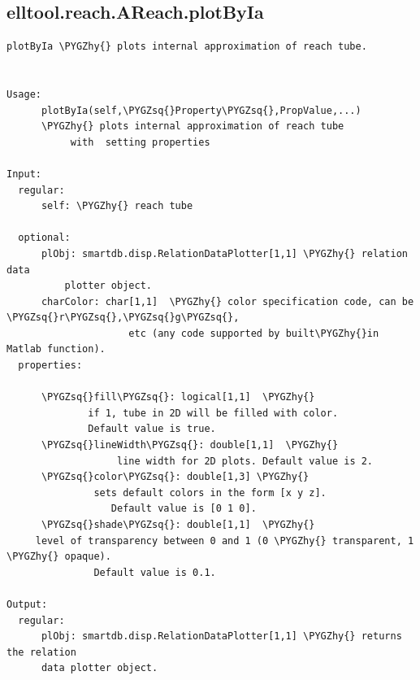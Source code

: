 \documentclass[letterpaper,10pt,english]{sphinxmanual}
\def\PYGZhy{\char`\-}
\def\PYGZsq{\char`\'}
\begin{document}
\subsection{elltool.reach.AReach.plotByIa}
\label{chap_functions:elltool-reach-areach-plotbyia}
\begin{Verbatim}[commandchars=\\\{\}]
plotByIa \PYGZhy{} plots internal approximation of reach tube.


Usage:
      plotByIa(self,\PYGZsq{}Property\PYGZsq{},PropValue,...)
      \PYGZhy{} plots internal approximation of reach tube
           with  setting properties

Input:
  regular:
      self: \PYGZhy{} reach tube

  optional:
      plObj: smartdb.disp.RelationDataPlotter[1,1] \PYGZhy{} relation data
          plotter object.
      charColor: char[1,1]  \PYGZhy{} color specification code, can be \PYGZsq{}r\PYGZsq{},\PYGZsq{}g\PYGZsq{},
                     etc (any code supported by built\PYGZhy{}in Matlab function).
  properties:

      \PYGZsq{}fill\PYGZsq{}: logical[1,1]  \PYGZhy{}
              if 1, tube in 2D will be filled with color.
              Default value is true.
      \PYGZsq{}lineWidth\PYGZsq{}: double[1,1]  \PYGZhy{}
                   line width for 2D plots. Default value is 2.
      \PYGZsq{}color\PYGZsq{}: double[1,3] \PYGZhy{}
               sets default colors in the form [x y z].
                  Default value is [0 1 0].
      \PYGZsq{}shade\PYGZsq{}: double[1,1]  \PYGZhy{}
     level of transparency between 0 and 1 (0 \PYGZhy{} transparent, 1 \PYGZhy{} opaque).
               Default value is 0.1.

Output:
  regular:
      plObj: smartdb.disp.RelationDataPlotter[1,1] \PYGZhy{} returns the relation
      data plotter object.
\end{Verbatim}
\end{document}
